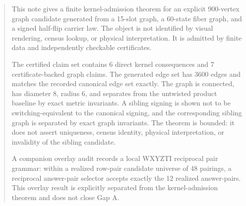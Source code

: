 \begin{abstract}
This note gives a finite kernel-admission theorem for an explicit 900-vertex graph candidate generated from a 15-slot graph, a 60-state fiber graph, and a signed half-flip carrier law. The object is not identified by visual rendering, census lookup, or physical interpretation. It is admitted by finite data and independently checkable certificates.

The certified claim set contains 6 direct kernel consequences and 7 certificate-backed graph claims. The generated edge set has 3600 edges and matches the recorded canonical edge set exactly. The graph is connected, has diameter 8, radius 6, and separates from the untwisted product baseline by exact metric invariants. A sibling signing is shown not to be switching-equivalent to the canonical signing, and the corresponding sibling graph is separated by exact graph invariants. The theorem is bounded: it does not assert uniqueness, census identity, physical interpretation, or invalidity of the sibling candidate.

A companion overlay audit records a local WXYZTI reciprocal pair grammar: within a realized row-pair candidate universe of 48 pairings, a reciprocal answer-pair selector accepts exactly the 12 realized answer-pairs. This overlay result is explicitly separated from the kernel-admission theorem and does not close Gap A.
\end{abstract}

